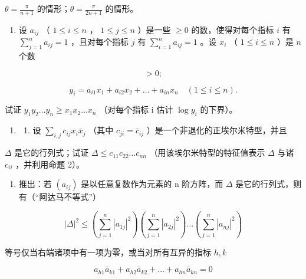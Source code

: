 \(\theta = \frac{\pi}{n + 1}\) 的情形；\(\theta = \frac{\pi}{2n + 1}\) 的情形。

\begin{enumerate}
\def\labelenumi{\arabic{enumi})}
\setcounter{enumi}{10}
\tightlist
\item
  设 \(a_{ij}\) （ \(1 \leqslant i \leqslant n\) ， \(1 \leqslant j \leqslant n\) ）是一些 \(\geqslant 0\) 的数，使得对每个指标 \(i\) 有 \(\sum_{j=1}^{n} a_{ij} = 1\) ，且对每个指标 \(j\) 有 \(\sum_{i=1}^{n} a_{ij} = 1\) 。设 \(x_i\) （ \(1 \leqslant i \leqslant n\) ）是 \(n\) 个数
\end{enumerate}

\[
> 0;
\]

\[
y _ {i} = a _ {i 1} x _ {1} + a _ {i 2} x _ {2} + \dots + a _ {i n} x _ {n} \quad (1 \leqslant i \leqslant n).
\]

试证 \(y_{1}y_{2}\ldots y_{n}\geqslant x_{1}x_{2}\ldots x_{n}\) （对每个指标 i 估计 \(\log y_{i}\) 的下界）。

\begin{enumerate}
\def\labelenumi{\arabic{enumi})}
\setcounter{enumi}{11}
\tightlist
\item
  \begin{enumerate}
  \def\labelenumii{\alph{enumii})}
  \tightlist
  \item
    设 \(\sum_{i,j} c_{ij} x_i \bar{x}_j\) （其中 \(c_{ji} = \bar{c}_{ij}\) ）是一个非退化的正埃尔米特型，并且
  \end{enumerate}
\end{enumerate}

\(\Delta\) 是它的行列式；试证 \(\Delta \leqslant c_{11}c_{22}\ldots c_{nn}\) （用该埃尔米特型的特征值表示 \(\Delta\) 与诸 \(c_{ii}\) ，并利用命题 2）。

\begin{enumerate}
\def\labelenumi{\alph{enumi})}
\setcounter{enumi}{1}
\tightlist
\item
  推出：若 \((a_{ij})\) 是以任意复数作为元素的 n 阶方阵，而 \(\Delta\) 是它的行列式，则有（“阿达马不等式”）
\end{enumerate}

\[
\left| \Delta \right| ^ {2} \leqslant \left(\sum_ {j = 1} ^ {n} \left| a _ {1 j} \right| ^ {2}\right) \left(\sum_ {j = 1} ^ {n} \left| a _ {2 j} \right| ^ {2}\right) \dots \left(\sum_ {j = 1} ^ {n} \left| a _ {n j} \right| ^ {2}\right)
\]

等号仅当右端诸项中有一项为零，或当对所有互异的指标 \(h, k\)

\[
a _ {h 1} \bar {a} _ {k 1} + a _ {h 2} \bar {a} _ {k 2} + \dots + a _ {h n} \bar {a} _ {k n} = 0
\]

